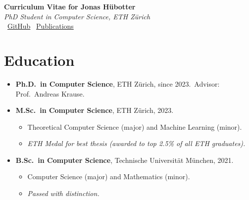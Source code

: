 \documentclass[a4paper,11pt]{article}
\begin{document}
\begin{center}
  {\LARGE\bfseries Curriculum Vitae for Jonas Hübotter}\\[4pt]
  {\itshape PhD Student in Computer Science, ETH Zürich}\\[8pt]
  \faGithub\ \href{https://github.com/jonhue}{GitHub}
  \quad
  \faGraduationCap\ \href{https://scholar.google.com/citations?user=pxi_RkwAAAAJ}{Publications}
\end{center}

\vspace{0.5ex}

\section*{Education}
\begin{itemize}[leftmargin=1.5em]
  \item \textbf{Ph.D.\ in Computer Science}, ETH Zürich, since 2023.\ Advisor: Prof.\ Andreas Krause.

  \item \textbf{M.Sc.\ in Computer Science}, ETH Zürich, 2023. \begin{itemize}
    \item Theoretical Computer Science (major) and Machine Learning (minor).
    \item \emph{ETH Medal for best thesis (awarded to top 2.5\% of all ETH graduates).}
  \end{itemize}

  \item \textbf{B.Sc.\ in Computer Science}, Technische Universität München, 2021. \begin{itemize}
    \item Computer Science (major) and Mathematics (minor).
    \item \emph{Passed with distinction.}
  \end{itemize}
\end{itemize}

\end{document}
